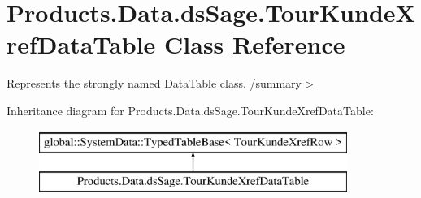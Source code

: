 \hypertarget{class_products_1_1_data_1_1ds_sage_1_1_tour_kunde_xref_data_table}{}\section{Products.\+Data.\+ds\+Sage.\+Tour\+Kunde\+Xref\+Data\+Table Class Reference}
\label{class_products_1_1_data_1_1ds_sage_1_1_tour_kunde_xref_data_table}


Represents the strongly named Data\+Table class. /summary$>$  


Inheritance diagram for Products.\+Data.\+ds\+Sage.\+Tour\+Kunde\+Xref\+Data\+Table\+:\begin{figure}[H]
\begin{center}
\leavevmode
\includegraphics[height=2.000000cm]{class_products_1_1_data_1_1ds_sage_1_1_tour_kunde_xref_data_table}
\end{center}
\end{figure}
